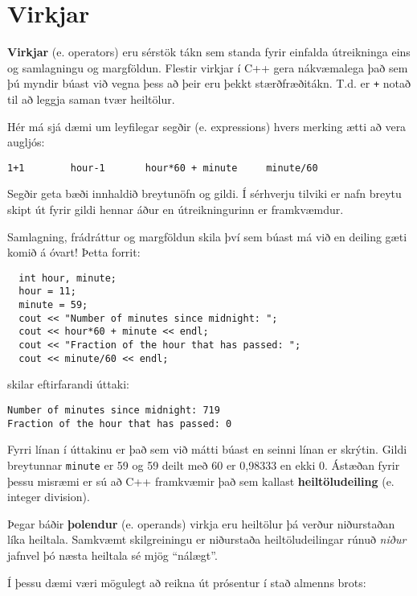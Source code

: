 \section{Virkjar}

{\bf Virkjar} (e. operators) eru sérstök tákn sem standa fyrir einfalda útreikninga eins og samlagningu og margföldun.
Flestir virkjar í C++ gera nákvæmalega það sem þú myndir búast við vegna þess að þeir eru þekkt stærðfræðitákn.
T.d. er {\tt +} notað til að leggja saman tvær heiltölur.

Hér má sjá dæmi um leyfilegar segðir (e. expressions) hvers merking ætti að vera augljós:

\begin{verbatim}
1+1        hour-1       hour*60 + minute     minute/60
\end{verbatim}
%
Segðir geta bæði innhaldið breytunöfn og gildi.
Í sérhverju tilviki er nafn breytu skipt út fyrir gildi hennar áður en útreikningurinn er framkvæmdur.


Samlagning, frádráttur og margföldun skila því sem búast má við en deiling gæti komið á óvart!
Þetta forrit:

\begin{verbatim}
  int hour, minute;
  hour = 11;
  minute = 59;
  cout << "Number of minutes since midnight: ";
  cout << hour*60 + minute << endl;
  cout << "Fraction of the hour that has passed: ";
  cout << minute/60 << endl;
\end{verbatim}
%
skilar eftirfarandi úttaki:

\begin{verbatim}
Number of minutes since midnight: 719
Fraction of the hour that has passed: 0
\end{verbatim}
%
Fyrri línan í úttakinu er það sem við mátti búast en seinni línan er skrýtin.
Gildi breytunnar {\tt minute} er 59 og 59 deilt með 60 er 0,98333 en ekki 0.
Ástæðan fyrir þessu misræmi er sú að C++ framkvæmir það sem kallast {\bf heiltöludeiling} (e. integer division).


Þegar báðir {\bf þolendur} (e. operands) virkja eru heiltölur þá verður niðurstaðan líka heiltala.
Samkvæmt skilgreiningu er niðurstaða heiltöludeilingar rúnuð {\em niður} jafnvel þó næsta heiltala sé mjög ``nálægt''.

Í þessu dæmi væri mögulegt að reikna út prósentur í stað almenns brots:

